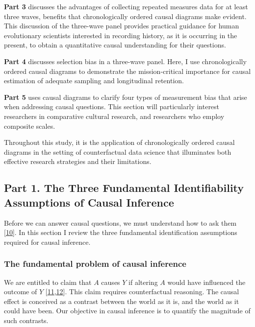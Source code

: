 \documentclass[
  singlecolumn]{article}
\begin{document}
\textbf{Part 3} discusses the advantages of collecting repeated measures
data for at least three waves, benefits that chronologically ordered
causal diagrams make evident. This discussion of the three-wave panel
provides practical guidance for human evolutionary scientists interested
in recording history, as it is occurring in the present, to obtain a
quantitative causal understanding for their questions.

\textbf{Part 4} discusses selection bias in a three-wave panel. Here, I
use chronologically ordered causal diagrams to demonstrate the
mission-critical importance for causal estimation of adequate sampling
and longitudinal retention.

\textbf{Part 5} uses causal diagrams to clarify four types of
measurement bias that arise when addressing causal questions. This
section will particularly interest researchers in comparative cultural
research, and researchers who employ composite scales.

Throughout this study, it is the application of chronologically ordered
causal diagrams in the setting of counterfactual data science that
illuminates both effective research strategies and their limitations.

\hypertarget{part-1.-the-three-fundamental-identifiability-assumptions-of-causal-inference}{%
\subsection{Part 1. The Three Fundamental Identifiability Assumptions of
Causal
Inference}\label{part-1.-the-three-fundamental-identifiability-assumptions-of-causal-inference}}

Before we can answer causal questions, we must understand how to ask
them {[}\protect\hyperlink{ref-hernuxe1n2016}{10}{]}. In this section I
review the three fundamental identification assumptions required for
causal inference.

\hypertarget{the-fundamental-problem-of-causal-inference}{%
\subsubsection{The fundamental problem of causal
inference}\label{the-fundamental-problem-of-causal-inference}}

We are entitled to claim that \(A\) causes \(Y\) if altering \(A\) would
have influenced the outcome of \(Y\)
{[}\protect\hyperlink{ref-hume1902}{11},\protect\hyperlink{ref-lewis1973}{12}{]}.
This claim requires counterfactual reasoning. The causal effect is
conceived as a contrast between the world as it is, and the world as it
could have been. Our objective in causal inference is to quantify the
magnitude of such contrasts.
\end{document}
